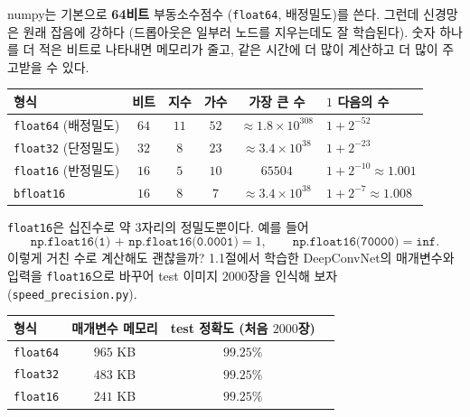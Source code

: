 \documentclass[11pt,a4paper]{article}
\begin{document}
numpy는 기본으로 \textbf{64비트} 부동소수점수 (\texttt{float64}, 배정밀도)를 쓴다.
그런데 신경망은 원래 잡음에 강하다 (드롭아웃은 일부러 노드를 지우는데도 잘 학습된다).
숫자 하나를 더 적은 비트로 나타내면 메모리가 줄고, 같은 시간에 더 많이 계산하고 더 많이 주고받을 수 있다.

\begin{center}
{\small
\begin{tabular}{@{}lccccl@{}}
\toprule
형식 & 비트 & 지수 & 가수 & 가장 큰 수 & $1$ 다음의 수 \\
\midrule
\texttt{float64} (배정밀도) & $64$ & $11$ & $52$ & $\approx1.8\times10^{308}$ & $1+2^{-52}$ \\
\texttt{float32} (단정밀도) & $32$ & $8$ & $23$ & $\approx3.4\times10^{38}$ & $1+2^{-23}$ \\
\texttt{float16} (반정밀도) & $16$ & $5$ & $10$ & $65504$ & $1+2^{-10}\approx1.001$ \\
\texttt{bfloat16} & $16$ & $8$ & $7$ & $\approx3.4\times10^{38}$ & $1+2^{-7}\approx1.008$ \\
\bottomrule
\end{tabular}}
\end{center}

\texttt{float16}은 십진수로 약 $3$자리의 정밀도뿐이다. 예를 들어
\[
\texttt{np.float16(1) + np.float16(0.0001)} = 1, \qquad \texttt{np.float16(70000)} = \texttt{inf} .
\]
이렇게 거친 수로 계산해도 괜찮을까?
1.1절에서 학습한 DeepConvNet의 매개변수와 입력을 \texttt{float16}으로 바꾸어 test 이미지 $2000$장을 인식해 보자 (\texttt{speed\_precision.py}).

\begin{center}
{\small
\begin{tabular}{@{}lccr@{}}
\toprule
형식 & 매개변수 메모리 & test 정확도 (처음 $2000$장) \\
\midrule
\texttt{float64} & $965$ KB & $99.25\%$ \\
\texttt{float32} & $483$ KB & $99.25\%$ \\
\texttt{float16} & $241$ KB & $99.25\%$ \\
\bottomrule
\end{tabular}}
\end{center}
\end{document}
